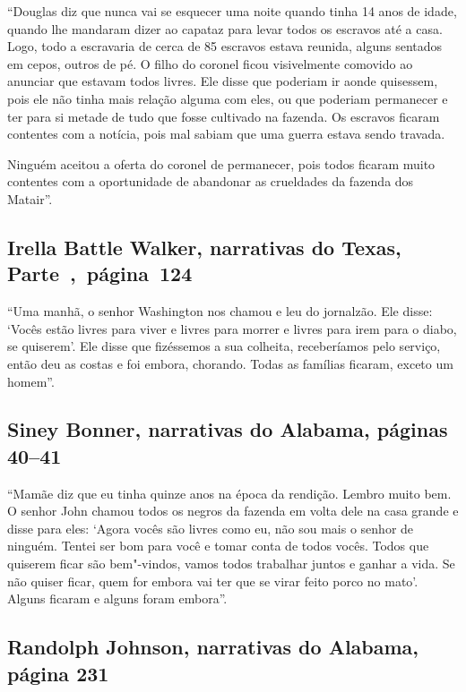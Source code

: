 ``Douglas diz que nunca vai se esquecer uma noite quando tinha 14 anos
de idade, quando lhe mandaram dizer ao capataz para levar todos os
escravos até a casa. Logo, todo a escravaria de cerca de 85 escravos
estava reunida, alguns sentados em cepos, outros de pé. O filho do
coronel ficou visivelmente comovido ao anunciar que estavam todos
livres. Ele disse que poderiam ir aonde quisessem, pois ele não tinha
mais relação alguma com eles, ou que poderiam permanecer e ter para si
metade de tudo que fosse cultivado na fazenda. Os escravos ficaram
contentes com a notícia, pois mal sabiam que uma guerra estava sendo
travada.

Ninguém aceitou a oferta do coronel de permanecer, pois todos ficaram
muito contentes com a oportunidade de abandonar as crueldades da fazenda
dos Matair''.

\subsection{Irella Battle Walker, narrativas do Texas, Parte~,~página~124}
\label{ref272}

``Uma manhã, o senhor Washington nos chamou e leu do jornalzão. Ele
disse: `Vocês estão livres para viver e livres para morrer e livres para
irem para o diabo, se quiserem'. Ele disse que fizéssemos a sua
colheita, receberíamos pelo serviço, então deu as costas e foi embora,
chorando. Todas as famílias ficaram, exceto um homem''.

\subsection{Siney Bonner, narrativas do Alabama, páginas 40--41} \label{ref29}

``Mamãe diz que eu tinha quinze anos na época da rendição. Lembro muito
bem. O senhor John chamou todos os negros da fazenda em volta dele na
casa grande e disse para eles: `Agora vocês são livres como eu, não sou
mais o senhor de ninguém. Tentei ser bom para você e tomar conta de
todos vocês. Todos que quiserem ficar são bem"-vindos, vamos todos
trabalhar juntos e ganhar a vida. Se não quiser ficar, quem for embora
vai ter que se virar feito porco no mato'. Alguns ficaram e alguns foram
embora''.

\subsection{Randolph Johnson, narrativas do Alabama, página 231}
\label{ref164}

